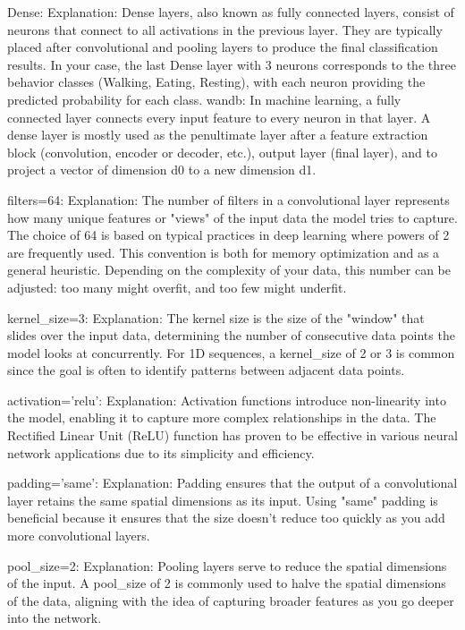     Dense:
        Explanation: Dense layers, also known as fully connected layers, consist of neurons that connect to all activations in the previous layer. They are typically placed after convolutional and pooling layers to produce the final classification results. In your case, the last Dense layer with 3 neurons corresponds to the three behavior classes (Walking, Eating, Resting), with each neuron providing the predicted probability for each class.
        wandb: In machine learning, a fully connected layer connects every input feature to every neuron in that layer. A dense layer is mostly used as the penultimate layer after a feature extraction block (convolution, encoder or decoder, etc.), output layer (final layer), and to project a vector of dimension d0 to a new dimension d1.

    filters=64:
        Explanation: The number of filters in a convolutional layer represents how many unique features or "views" of the input data the model tries to capture. The choice of 64 is based on typical practices in deep learning where powers of 2 are frequently used. This convention is both for memory optimization and as a general heuristic. Depending on the complexity of your data, this number can be adjusted: too many might overfit, and too few might underfit.

    kernel_size=3:
        Explanation: The kernel size is the size of the "window" that slides over the input data, determining the number of consecutive data points the model looks at concurrently. For 1D sequences, a kernel_size of 2 or 3 is common since the goal is often to identify patterns between adjacent data points.

    activation='relu':
        Explanation: Activation functions introduce non-linearity into the model, enabling it to capture more complex relationships in the data. The Rectified Linear Unit (ReLU) function has proven to be effective in various neural network applications due to its simplicity and efficiency.

    padding='same':
        Explanation: Padding ensures that the output of a convolutional layer retains the same spatial dimensions as its input. Using "same" padding is beneficial because it ensures that the size doesn’t reduce too quickly as you add more convolutional layers.

    pool_size=2:
        Explanation: Pooling layers serve to reduce the spatial dimensions of the input. A pool_size of 2 is commonly used to halve the spatial dimensions of the data, aligning with the idea of capturing broader features as you go deeper into the network.






